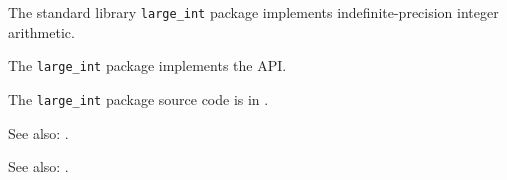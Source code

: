 
The standard library {\tt large\_int} package implements 
indefinite-precision integer arithmetic.

The {\tt large\_int} package implements the  API.

The {\tt large\_int} package source code is in .

See also:  .

See also:  .


